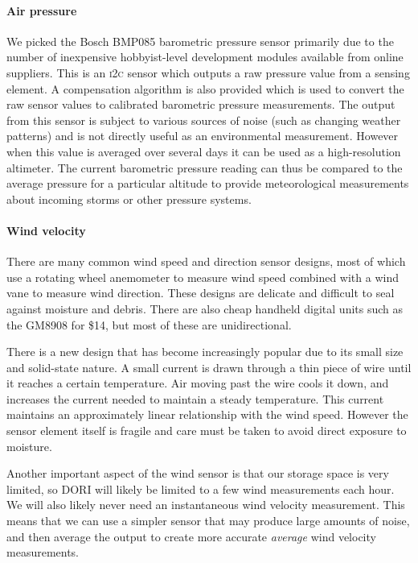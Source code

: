 \documentclass[12pt]{article}
\newcommand{\brand}{}
\begin{document}
    \paragraph*{Air pressure}
    We picked the \brand{Bosch BMP085} barometric pressure sensor primarily due to the number of inexpensive hobbyist-level development modules available from online suppliers. This is an \textsc{i2c} sensor which outputs a raw pressure value from a sensing element. A compensation algorithm is also provided which is used to convert the raw sensor values to calibrated barometric pressure measurements. The output from this sensor is subject to various sources of noise (such as changing weather patterns) and is not directly useful as an environmental measurement. However when this value is averaged over several days it can be used as a high-resolution altimeter. The current barometric pressure reading can thus be compared to the average pressure for a particular altitude to provide meteorological measurements about incoming storms or other pressure systems.

    \paragraph*{Wind velocity}
There are many common wind speed and direction sensor designs, most of which use a rotating wheel anemometer to measure wind speed combined with a wind vane to measure wind direction. These designs are delicate and difficult to seal against moisture and debris. There are also cheap handheld digital units such as the \textsc{GM8908}\cite{gm8908} for \$14, but most of these are unidirectional.

There is a new design that has become increasingly popular due to its small size and solid-state nature. A small current is drawn through a thin piece of wire until it reaches a certain temperature. Air moving past the wire cools it down, and increases the current needed to maintain a steady temperature. This current maintains an approximately linear relationship with the wind speed. However the sensor element itself is fragile and care must be taken to avoid direct exposure to moisture.

Another important aspect of the wind sensor is that our storage space is very limited, so DORI will likely be limited to a few wind measurements each hour. We will also likely never need an instantaneous wind velocity measurement. This means that we can use a simpler sensor that may produce large amounts of noise, and then average the output to create more accurate \emph{average} wind velocity measurements.
\end{document}
